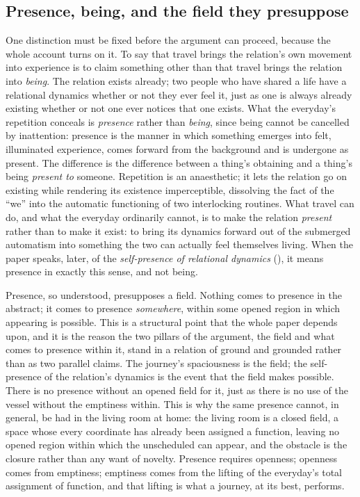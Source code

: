 \subsection{Presence, being, and the field they presuppose}
\label{p21:sub:intro-presence}

One distinction must be fixed before the argument can proceed, because the whole account turns on it. To say that travel brings the relation's own movement into experience is to claim something other than that travel brings the relation into \emph{being}. The relation exists already; two people who have shared a life have a relational dynamics whether or not they ever feel it, just as one is always already existing whether or not one ever notices that one exists. What the everyday's repetition conceals is \emph{presence} rather than \emph{being}, since being cannot be cancelled by inattention: presence is the manner in which something emerges into felt, illuminated experience, comes forward from the background and is undergone as present. The difference is the difference between a thing's obtaining and a thing's being \emph{present to} someone. Repetition is an anaesthetic; it lets the relation go on existing while rendering its existence imperceptible, dissolving the fact of the ``we'' into the automatic functioning of two interlocking routines. What travel can do, and what the everyday ordinarily cannot, is to make the relation \emph{present} rather than to make it exist: to bring its dynamics forward out of the submerged automatism into something the two can actually feel themselves living. When the paper speaks, later, of the \emph{self-presence of relational dynamics} (), it means presence in exactly this sense, and not being.

Presence, so understood, presupposes a field. Nothing comes to presence in the abstract; it comes to presence \emph{somewhere}, within some opened region in which appearing is possible. This is a structural point that the whole paper depends upon, and it is the reason the two pillars of the argument, the field and what comes to presence within it, stand in a relation of ground and grounded rather than as two parallel claims. The journey's spaciousness is the field; the self-presence of the relation's dynamics is the event that the field makes possible. There is no presence without an opened field for it, just as there is no use of the vessel without the emptiness within. This is why the same presence cannot, in general, be had in the living room at home: the living room is a closed field, a space whose every coordinate has already been assigned a function, leaving no opened region within which the unscheduled can appear, and the obstacle is the closure rather than any want of novelty. Presence requires openness; openness comes from emptiness; emptiness comes from the lifting of the everyday's total assignment of function, and that lifting is what a journey, at its best, performs.

